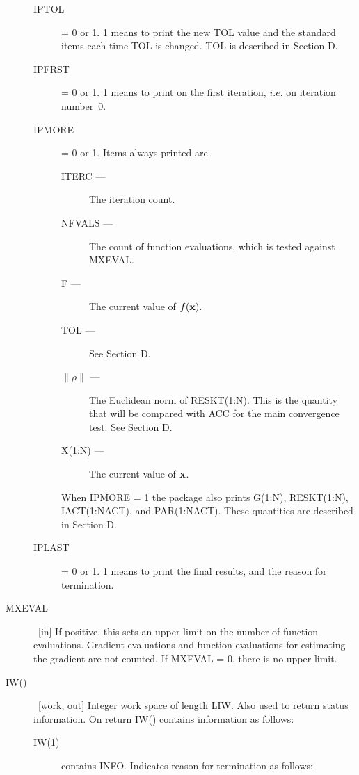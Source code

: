 \documentclass[twoside]{MATH77}
\begin{document}
\begin{description}
\begin{description}
\item[\rm IPTOL] = 0 or 1. 1 means to print the new TOL value and the standard items
each time TOL is changed. TOL is described in Section D.

\item[\rm IPFRST] = 0 or 1. 1 means to print on the first iteration, $i.e$. on
iteration number~0.

\item[\rm IPMORE] = 0 or 1. Items always printed are
\begin{description}
\item[\rm ITERC ---]  The iteration count.

\item[\rm NFVALS ---]  The count of function evaluations, which is tested
against MXEVAL.

\item[\rm F ---]  The current value of $f({\bf x}).$

\item[\rm TOL ---]  See Section D.

\item[\rm $\|\rho \|$ ---]  The Euclidean norm of RESKT(1:N).  This is the
quantity that will be compared with ACC for the main convergence test. See
Section D.

\item[\rm X(1:N) ---]  The current value of ${\bf x}$.
\end{description}

When IPMORE = 1 the package also prints G(1:N), RESKT(1:N), IACT(1:NACT),
and PAR(1:NACT). These quantities are described in Section D.

\item[\rm IPLAST] = 0 or 1. 1 means to print the final results, and the
reason for termination.
\end{description}

\item[MXEVAL]  \ [in] If positive, this sets an upper limit on the number of
function evaluations. Gradient evaluations and function evaluations for
estimating the gradient are not counted. If MXEVAL = 0, there is no upper
limit.

\item[IW()]  \ [work, out] Integer work space of length LIW. Also used to
return status information. On return IW() contains information as follows:

\begin{description}
\item[IW(1)]  contains INFO. Indicates reason for termination as follows:


\end{description}
\end{description}
\end{document}
